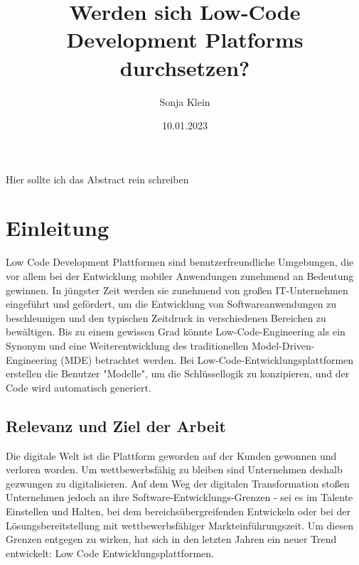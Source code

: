 \documentclass{article}
\title{Werden sich Low-Code Development Platforms durchsetzen?}
\author{Sonja Klein}
\date{10.01.2023}
\begin{document}
	
	Hier sollte ich das Abstract rein schreiben
	
	\maketitle	
	\tableofcontents	
	\newpage
	
	\section{Einleitung}
	
	Low Code Development Plattformen sind benutzerfreundliche Umgebungen, die vor allem bei der Entwicklung mobiler Anwendungen zunehmend an Bedeutung gewinnen. In jüngster Zeit werden sie zunehmend von großen IT-Unternehmen eingeführt und gefördert, um die Entwicklung von Softwareanwendungen zu beschleunigen und den typischen Zeitdruck in verschiedenen Bereichen zu bewältigen. Bis zu einem gewissen Grad könnte Low-Code-Engineering als ein Synonym und eine Weiterentwicklung des traditionellen Model-Driven-Engineering (MDE) betrachtet werden.
	Bei Low-Code-Entwicklungsplattformen erstellen die Benutzer "Modelle", um die Schlüssellogik zu konzipieren, und der Code wird automatisch generiert.
	\cite{Wang.2021}
	
	\subsection{Relevanz und Ziel der Arbeit}
	
	
	
	
	
	
	
	Die digitale Welt ist die Plattform geworden auf der Kunden gewonnen und verloren worden. Um wettbewerbsfähig zu bleiben sind Unternehmen deshalb gezwungen zu digitalisieren. Auf dem Weg der digitalen Transformation stoßen Unternehmen jedoch an ihre Software-Entwicklungs-Grenzen - sei es im Talente Einstellen und Halten, bei dem bereichsübergreifenden Entwickeln oder bei der Lösungsbereitstellung mit wettbewerbsfähiger Markteinführungszeit.	
	Um diesen Grenzen entgegen zu wirken, hat sich in den letzten Jahren ein neuer Trend entwickelt: Low Code Entwicklungsplattformen. \cite{EmmaVanPelt.2019} %
	
\end{document}
